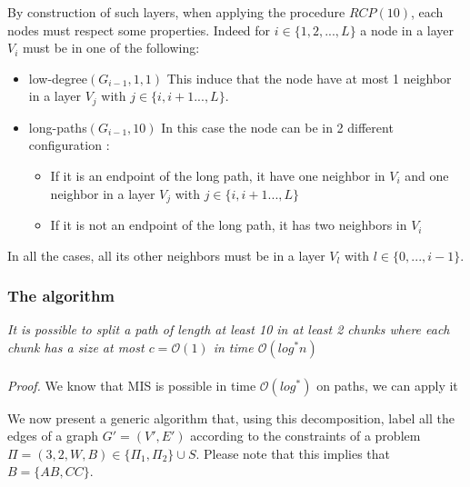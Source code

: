 By construction of such layers, when applying the procedure $RCP(10)$, each nodes must respect some properties. Indeed for $i \in \{1,2,...,L\}$ a node in a layer $V_i$ must be in one of the following:
\begin{itemize}
    \item low-degree$(G_{i-1},1,1)$
    This induce that the node have at most 1 neighbor in a layer $V_j$ with $j \in \{i,i+1...,L\}$.
    
    \item long-paths$(G_{i-1},10)$
    In this case the node can be in 2 different configuration :
    \begin{itemize}
        \item If it is an endpoint of the long path, it have one neighbor in $V_i$ and one neighbor in a layer $V_j$ with $j \in \{i,i+1...,L\}$ 
        \item If it is not an endpoint of the long path, it has two neighbors in $V_i$
    \end{itemize}
\end{itemize}
In all the cases, all its other neighbors must be in a layer $V_l$ with $l \in \{0,...,i-1\}$.

\subsubsection{The algorithm}

\begin{claim}\label{claim:path} \textit{It is possible to split a path of length at least 10 in at least 2 chunks where each chunk has a size at most $c = \mathcal{O}(1)$ in time $\mathcal{O}(log^*n)$}\\\\
\textit{Proof.} We know that MIS is possible in time $\mathcal{O}(log^*)$ on paths, we can apply it 

\end{claim}
We now present a generic algorithm that, using this decomposition, label all the edges of a graph $G'=(V',E')$ according to the constraints of a problem $\Pi=(3,2,W,B) \in \{\Pi_1,\Pi_2\}\cup S$. Please note that this implies that $B=\{AB,CC\}$.

